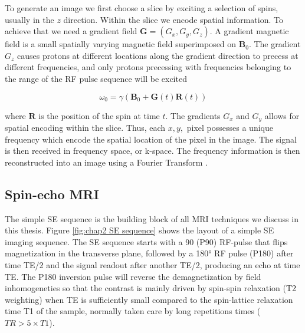 To generate an image we first choose a slice by exciting a selection of spins, usually in the $z$ direction. Within the slice we encode spatial information.  To achieve that we need a gradient field $\textbf{G}=(G_{x},G_{y},G_{z})$. A gradient magnetic field is a small spatially varying magnetic field superimposed on $\textbf{B}_{0}$. The gradient $G_{z}$ causes protons at different locations along the gradient direction to precess at different frequencies, and only protons precessing with frequencies belonging to the range of the RF pulse sequence will be excited

\begin{equation}
\omega_{0}= \gamma (\textbf{B}_{0} + \textbf{G}(t)\textbf{R}(t))
\end{equation}

where $\textbf{R}$ is the position of the spin at time $t$. The gradients $G_{x}$ and $G_{y}$ allows for spatial encoding within the slice.  Thus, each $x,y,$ pixel possesses  a unique frequency which encode the spatial location of the pixel in the image. The signal is then received in frequency space, or k-space. The frequency information is then reconstructed into an image using a Fourier Transform \cite{liang2000principles}.

\subsection*{Spin-echo MRI}
The simple {\gls{SE}} sequence is the building block of all MRI techniques we discuss in this thesis. Figure \ref{fig:chap2 SE sequence} shows the layout of a simple \gls{SE} imaging sequence. The \gls{SE} sequence starts with a 90 (P90) RF-pulse that flips magnetization in the transverse plane, followed by a 180° RF pulse (P180) after time TE/2 and the signal readout after another TE/2, producing an echo at time TE. The P180 inversion pulse will reverse the demagnetization by field inhomogeneties so that the contrast is mainly driven by spin-spin relaxation (T2 weighting) when TE is sufficiently small compared to the spin-lattice relaxation time T1 of the sample, normally taken care by long repetitions times ($TR>5\times T1 $). 


